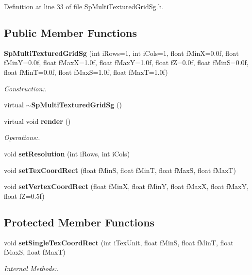 Definition at line 33 of file Sp\-Multi\-Textured\-Grid\-Sg.h.\subsection*{Public Member Functions}
\begin{CompactItemize}
\item 
{\bf Sp\-Multi\-Textured\-Grid\-Sg} (int i\-Rows=1, int i\-Cols=1, float f\-Min\-X=0.0f, float f\-Min\-Y=0.0f, float f\-Max\-X=1.0f, float f\-Max\-Y=1.0f, float f\-Z=0.0f, float f\-Min\-S=0.0f, float f\-Min\-T=0.0f, float f\-Max\-S=1.0f, float f\-Max\-T=1.0f)
\begin{CompactList}\small\item\em Construction:. \item\end{CompactList}\item 
virtual {\bf $\sim$Sp\-Multi\-Textured\-Grid\-Sg} ()
\item 
virtual void {\bf render} ()
\begin{CompactList}\small\item\em Operations:. \item\end{CompactList}\item 
void {\bf set\-Resolution} (int i\-Rows, int i\-Cols)
\item 
void {\bf set\-Tex\-Coord\-Rect} (float f\-Min\-S, float f\-Min\-T, float f\-Max\-S, float f\-Max\-T)
\item 
void {\bf set\-Vertex\-Coord\-Rect} (float f\-Min\-X, float f\-Min\-Y, float f\-Max\-X, float f\-Max\-Y, float f\-Z=0.5f)
\end{CompactItemize}
\subsection*{Protected Member Functions}
\begin{CompactItemize}
\item 
void {\bf set\-Single\-Tex\-Coord\-Rect} (int i\-Tex\-Unit, float f\-Min\-S, float f\-Min\-T, float f\-Max\-S, float f\-Max\-T)
\begin{CompactList}\small\item\em Internal Methods:. \item\end{CompactList}\end{CompactItemize}
